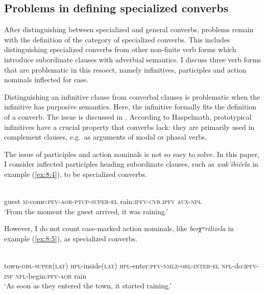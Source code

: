 ﻿\documentclass[output=paper]{langsci/langscibook}
\begin{document}
\subsection{Problems in defining specialized converbs}\label{problems-in-defining-specialized-converbs}

After distinguishing between specialized and general converbs, problems
remain with the definition of the category of specialized converbs. This
includes distinguishing specialized converbs from other non-finite verb
forms which introduce subordinate clauses with adverbial semantics. I
discuss three verb forms that are problematic in this resoect, namely
infinitives, participles and action nominals inflected for case.

Distinguishing an infinitive clause from converbal clauses is
problematic when the infinitive has purposive semantics. Here, the
infinitive formally fits the definition of a converb. The issue is
discussed in \citet{haspelmath1995a}. According to Haspelmath, prototypical
infinitives have a crucial property that converbs lack: they are
primarily used in complement clauses, e.g.\ as arguments of modal or
phasal verbs.

The issue of participles and action nominals is not so easy to solve. In
this paper, I consider inflected participles heading subordinate
clauses, such as \emph{wak'ibičela} in example (\ref{ex:8:4}), to be
specialized converbs.

\ea \label{ex:8:4} %
\\
guest \textsc{m}-come:\textsc{pfv}-\textsc{aor}-\textsc{ptcp}-\textsc{super}-\textsc{el} rain:\textsc{ipfv}-\textsc{cvb.ipfv} \textsc{aux}-\textsc{npl}\\
\glt `From the moment the guest arrived, it was raining.'
\z

However, I do not count case-marked action nominals, like
\emph{berχʷrilizela} in example (\ref{ex:8:5}), as specialized converbs.

\ea \label{ex:8:5} %
\\
town-\textsc{obl}-\textsc{super(lat)} \textsc{hpl}-inside(\textsc{lat}) \textsc{hpl}-enter:\textsc{pfv}-\textsc{nmlz}-\textsc{obl}-\textsc{inter}-\textsc{el} \textsc{npl}-do:\textsc{ipfv}-\textsc{inf} \textsc{npl}-begin:\textsc{pfv}-\textsc{aor} rain\\
\glt `As soon as they entered the town, it started raining.'
\z
\end{document}
